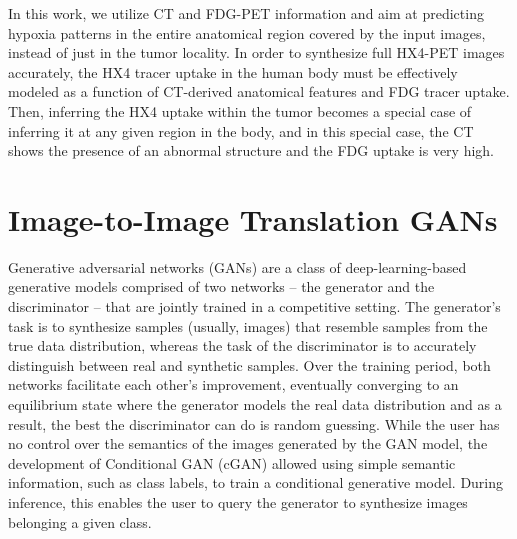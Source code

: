 In this work, we utilize CT and FDG-PET information and aim at predicting hypoxia patterns in the entire anatomical region covered by the input images, instead of just in the tumor locality. In order to synthesize full HX4-PET images accurately, the HX4 tracer uptake in the human body must be effectively modeled as a function of CT-derived anatomical features and FDG tracer uptake. Then, inferring the HX4 uptake within the tumor becomes a special case of inferring it at any given region in the body, and in this special case, the CT shows the presence of an abnormal structure and the FDG uptake is very high. 



\section{Image-to-Image Translation GANs}
Generative adversarial networks (GANs) \cite{goodfellow2014generative} are a class of deep-learning-based generative models comprised of two networks -- the generator and the discriminator -- that are jointly trained in a competitive setting. The generator's task is to synthesize samples (usually, images) that resemble samples from the true data distribution, whereas the task of the discriminator is to accurately distinguish between real and synthetic samples. Over the training period, both networks facilitate each other's improvement, eventually converging to an equilibrium state where the generator models the real data distribution and as a result, the best the discriminator can do is random guessing. While the user has no control over the semantics of the images generated by the GAN model, the development of Conditional GAN (cGAN) \cite{mirza2014conditional} allowed using simple semantic information, such as class labels, to train a conditional generative model. During inference, this enables the user to query the generator to synthesize images belonging a given class. 

